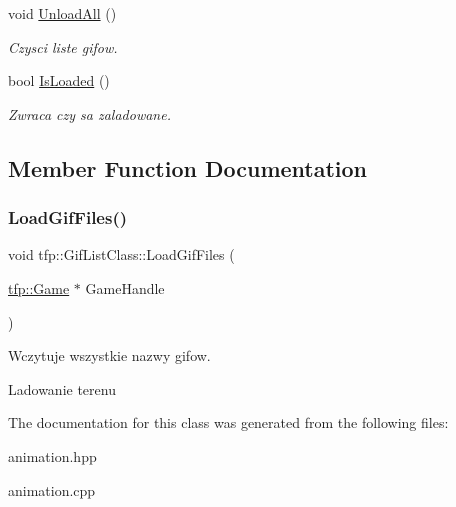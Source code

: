 \begin{DoxyCompactItemize}
\mbox{\label{classtfp_1_1_gif_list_class_a85be81017a36df487204c00cde949969}} 
void \mbox{\hyperlink{classtfp_1_1_gif_list_class_a85be81017a36df487204c00cde949969}{Unload\+All}} ()
\begin{DoxyCompactList}\small\item\em Czysci liste gifow. \end{DoxyCompactList}\item 
\mbox{\label{classtfp_1_1_gif_list_class_aa2a0875f8c697b743c7af810b09bf99f}} 
bool \mbox{\hyperlink{classtfp_1_1_gif_list_class_aa2a0875f8c697b743c7af810b09bf99f}{Is\+Loaded}} ()
\begin{DoxyCompactList}\small\item\em Zwraca czy sa zaladowane. \end{DoxyCompactList}\end{DoxyCompactItemize}


\subsection{Member Function Documentation}
\mbox{\label{classtfp_1_1_gif_list_class_abf690db9e0de251abdfc8f5550f2b32b}} 
\subsubsection{\texorpdfstring{Load\+Gif\+Files()}{LoadGifFiles()}}
{\footnotesize\ttfamily void tfp\+::\+Gif\+List\+Class\+::\+Load\+Gif\+Files (\begin{DoxyParamCaption}\item[{\mbox{\hyperlink{classtfp_1_1_game}{tfp\+::\+Game}} $\ast$}]{Game\+Handle }\end{DoxyParamCaption})}



Wczytuje wszystkie nazwy gifow. 

Ladowanie terenu 

The documentation for this class was generated from the following files\+:\begin{DoxyCompactItemize}
\item 
animation.\+hpp\item 
animation.\+cpp\end{DoxyCompactItemize}
